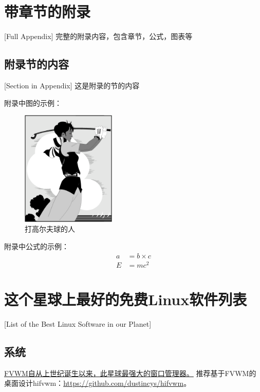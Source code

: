 \chapter{带章节的附录}[Full Appendix]%
完整的附录内容，包含章节，公式，图表等

\section{附录节的内容}[Section in Appendix]
这是附录的节的内容

附录中图的示例：
\begin{figure}[htbp]
\centering
\includegraphics[width = 0.4\textwidth]{golfer}
\caption{\xiaosi[0]打高尔夫球的人}
\end{figure}

附录中公式的示例：
\begin{align}
a & = b \times c \\
E & = m c^2
\label{eq}
\end{align}

\chapter{这个星球上最好的免费Linux软件列表}[List of the Best Linux Software in our Planet]
\section{系统}

\href{http://fvwm.org/}{FVWM自从上世纪诞生以来，此星球最强大的窗口管理器。}
推荐基于FVWM的桌面设计hifvwm：\href{https://github.com/dustincys/hifvwm}{https://github.com/dustincys/hifvwm}。


